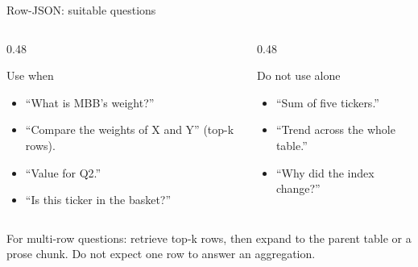 \documentclass[aspectratio=169,11pt]{beamer}
\begin{document}
\begin{frame}{Row-JSON: suitable questions}
  \begin{columns}[T]
    \begin{column}{0.48\textwidth}
      \begin{exampleblock}{Use when}
        \begin{itemize}\footnotesize
          \item ``What is MBB's weight?''
          \item ``Compare the weights of X and Y'' (top-k rows).
          \item ``Value for Q2.''
          \item ``Is this ticker in the basket?''
        \end{itemize}
      \end{exampleblock}
    \end{column}
    \begin{column}{0.48\textwidth}
      \begin{alertblock}{Do not use alone}
        \begin{itemize}\footnotesize
          \item ``Sum of five tickers.''
          \item ``Trend across the whole table.''
          \item ``Why did the index change?''
        \end{itemize}
      \end{alertblock}
    \end{column}
  \end{columns}

  \vfill
  {\footnotesize
  For multi-row questions: retrieve top-k rows, then expand to the parent table
  or a prose chunk. Do not expect one row to answer an aggregation.}
\end{frame}
\end{document}
